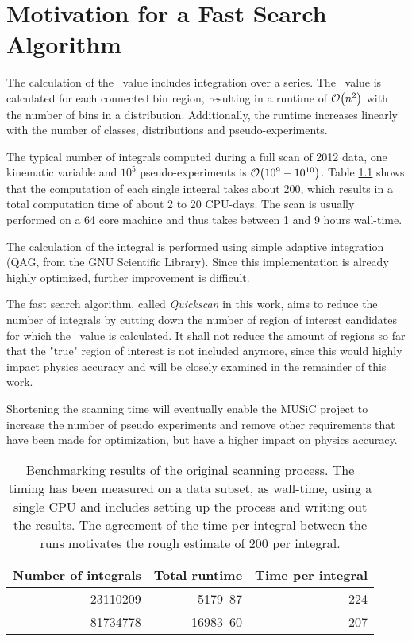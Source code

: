 
\chapter{Motivation for a Fast Search Algorithm}
\label{ch:quickkscan_motivation}

The calculation of the \p~value includes integration over a series. The \p~value is calculated for each connected bin region, resulting in a runtime of $\order{n^2}$ with the number of bins in a distribution. Additionally, the runtime increases linearly with the number of classes, distributions and pseudo-experiments.

The typical number of integrals computed during a full scan of 2012 data, one kinematic variable and $10^5$ pseudo-experiments is $\order{10^{9} - 10^{10}}$. Table \ref{tbl:motivation_timing} shows that the computation of each single integral takes about \unit{200}{\micro\second}, which results in a total computation time of about 2 to 20 CPU-days. The scan is usually performed on a 64 core machine and thus takes between 1 and 9 hours wall-time.

The calculation of the integral is performed using simple adaptive integration (QAG, from the GNU Scientific Library). Since this implementation is already highly optimized, further improvement is difficult.

The fast search algorithm, called \emph{Quickscan} in this work, aims to reduce the number of integrals by cutting down the number of region of interest candidates for which the \p~value is calculated. It shall not reduce the amount of regions so far that the "true" region of interest is not included anymore, since this would highly impact physics accuracy and will be closely examined in the remainder of this work.

Shortening the scanning time will eventually enable the MUSiC project to increase the number of pseudo experiments and remove other requirements that have been made for optimization, but have a higher impact on physics accuracy.

\begin{table}[htbp]
	\centering
	\begin{tabular}{| r | r || r |}
		\hline
		Number of integrals & Total runtime & Time per integral \\
		\hline \hline
		23110209 & \unit{5179.87}{\second} & \unit{224}{\micro\second} \\
		81734778 & \unit{16983.60}{\second} & \unit{207}{\micro\second} \\
		\hline
	\end{tabular}
	\caption{Benchmarking results of the original scanning process. The timing has been measured on a data subset, as wall-time, using a single CPU and includes setting up the process and writing out the results. The agreement of the time per integral between the runs motivates the rough estimate of \unit{200}{\micro\second} per integral.}
	\label{tbl:motivation_timing}
\end{table}